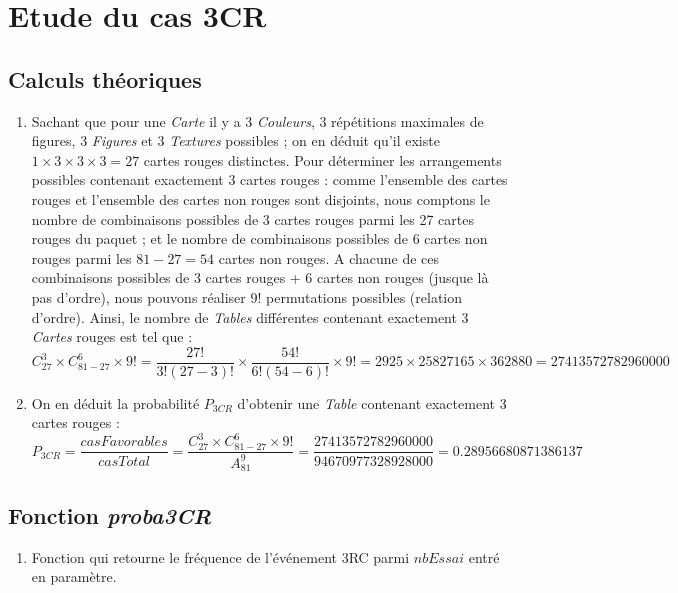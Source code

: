 \documentclass{report}
\begin{document}
\section{Etude du cas 3CR}
\subsection{Calculs théoriques}




\bigskip
\begin{enumerate}
	\item[\fcolorbox{black}{black}{\textbf{\textcolor{white}{6}}}] 
	Sachant que pour une \textit{Carte} il y a 3 \textit{Couleurs}, 3 répétitions maximales de figures, 3 \textit{Figures} et 3 \textit{Textures} possibles ; on en déduit qu'il existe $1\times3\times3\times3=27$ cartes rouges distinctes. Pour déterminer les arrangements possibles contenant exactement 3 cartes rouges : comme l'ensemble des cartes rouges et l'ensemble des cartes non rouges sont disjoints, nous comptons le nombre de combinaisons possibles de 3 cartes rouges parmi les 27 cartes rouges du paquet ; et le nombre de combinaisons possibles de 6 cartes non rouges parmi les $81 - 27 = 54$ cartes non rouges. A chacune de ces combinaisons possibles de 3 cartes rouges + 6 cartes non rouges (jusque là pas d'ordre), nous pouvons réaliser $9!$ permutations possibles (relation d'ordre). Ainsi, le nombre de \textit{Tables} différentes contenant exactement 3 \textit{Cartes} rouges est tel que :	
	$$C^{3}_{27} \times C^{6}_{81-27} \times 9! = \frac{27!}{3!(27-3)!} \times  \frac{54!}{6!(54-6)!} \times 9! = 2925 \times 25827165 \times 362880 = 27413572782960000$$

	\item[\fcolorbox{black}{black}{\textbf{\textcolor{white}{7}}}] 
	On en déduit la probabilité $P_{3CR}$ d'obtenir une \textit{Table} contenant exactement 3 cartes rouges :
	$$P_{3CR} = \dfrac{casFavorables}{casTotal} = \dfrac{C^{3}_{27} \times C^{6}_{81-27} \times 9!}{A^{9}_{81}} = \dfrac{27413572782960000}{94670977328928000} = 0.28956680871386137 $$
\end{enumerate}


\subsection{Fonction \textit{proba3CR}}


\begin{enumerate}
	\item [\fcolorbox{black}{black}{\textbf{\textcolor{white}{8}}}] 
	Fonction qui retourne le fréquence de l'événement 3RC parmi $nbEssai$ entré en paramètre.
\end{enumerate}
\end{document}
